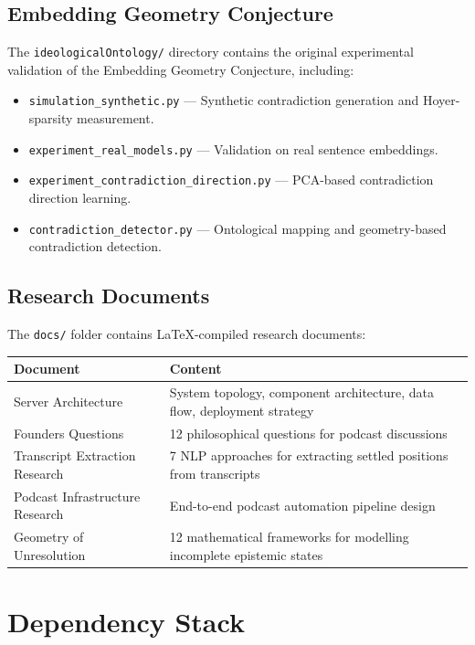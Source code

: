 \documentclass[11pt,letterpaper]{article}
\begin{document}
\subsection{Embedding Geometry Conjecture}

The \texttt{ideologicalOntology/} directory contains the original experimental validation of the Embedding Geometry Conjecture, including:

\begin{itemize}
\item \texttt{simulation\_synthetic.py} --- Synthetic contradiction generation and Hoyer-sparsity measurement.
\item \texttt{experiment\_real\_models.py} --- Validation on real sentence embeddings.
\item \texttt{experiment\_contradiction\_direction.py} --- PCA-based contradiction direction learning.
\item \texttt{contradiction\_detector.py} --- Ontological mapping and geometry-based contradiction detection.
\end{itemize}

\subsection{Research Documents}

The \texttt{docs/} folder contains LaTeX-compiled research documents:

\begin{tabularx}{\textwidth}{lX}
\toprule
\textbf{Document} & \textbf{Content} \\
\midrule
Server Architecture & System topology, component architecture, data flow, deployment strategy \\
Founders Questions & 12 philosophical questions for podcast discussions \\
Transcript Extraction Research & 7 NLP approaches for extracting settled positions from transcripts \\
Podcast Infrastructure Research & End-to-end podcast automation pipeline design \\
Geometry of Unresolution & 12 mathematical frameworks for modelling incomplete epistemic states \\
\bottomrule
\end{tabularx}

\section{Dependency Stack}
\end{document}
